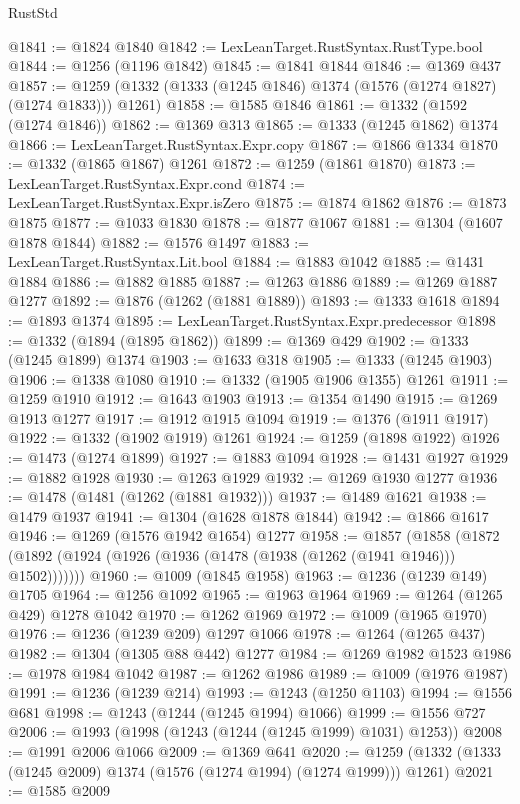 \begin{lexlean}{RustStd}
\begin{coremodule}
{\begin{coremodule}
{{{{{{{{{{{{{{{{{{{{{{{{{{{{{{{{{{{@1841 := @1824 @1840
@1842 := LexLeanTarget.RustSyntax.RustType.bool
@1844 := @1256 (@1196 @1842)
@1845 := @1841 @1844
@1846 := @1369 @437
@1857 := @1259 (@1332 (@1333 (@1245 @1846) @1374 (@1576 (@1274 @1827) (@1274 @1833))) @1261)
@1858 := @1585 @1846
@1861 := @1332 (@1592 (@1274 @1846))
@1862 := @1369 @313
@1865 := @1333 (@1245 @1862) @1374
@1866 := LexLeanTarget.RustSyntax.Expr.copy
@1867 := @1866 @1334
@1870 := @1332 (@1865 @1867) @1261
@1872 := @1259 (@1861 @1870)
@1873 := LexLeanTarget.RustSyntax.Expr.cond
@1874 := LexLeanTarget.RustSyntax.Expr.isZero
@1875 := @1874 @1862
@1876 := @1873 @1875
@1877 := @1033 @1830
@1878 := @1877 @1067
@1881 := @1304 (@1607 @1878 @1844)
@1882 := @1576 @1497
@1883 := LexLeanTarget.RustSyntax.Lit.bool
@1884 := @1883 @1042
@1885 := @1431 @1884
@1886 := @1882 @1885
@1887 := @1263 @1886
@1889 := @1269 @1887 @1277
@1892 := @1876 (@1262 (@1881 @1889))
@1893 := @1333 @1618
@1894 := @1893 @1374
@1895 := LexLeanTarget.RustSyntax.Expr.predecessor
@1898 := @1332 (@1894 (@1895 @1862))
@1899 := @1369 @429
@1902 := @1333 (@1245 @1899) @1374
@1903 := @1633 @318
@1905 := @1333 (@1245 @1903)
@1906 := @1338 @1080
@1910 := @1332 (@1905 @1906 @1355) @1261
@1911 := @1259 @1910
@1912 := @1643 @1903
@1913 := @1354 @1490
@1915 := @1269 @1913 @1277
@1917 := @1912 @1915 @1094
@1919 := @1376 (@1911 @1917)
@1922 := @1332 (@1902 @1919) @1261
@1924 := @1259 (@1898 @1922)
@1926 := @1473 (@1274 @1899)
@1927 := @1883 @1094
@1928 := @1431 @1927
@1929 := @1882 @1928
@1930 := @1263 @1929
@1932 := @1269 @1930 @1277
@1936 := @1478 (@1481 (@1262 (@1881 @1932)))
@1937 := @1489 @1621
@1938 := @1479 @1937
@1941 := @1304 (@1628 @1878 @1844)
@1942 := @1866 @1617
@1946 := @1269 (@1576 @1942 @1654) @1277
@1958 := @1857
    (@1858 (@1872 (@1892 (@1924 (@1926 (@1936 (@1478 (@1938 (@1262 (@1941 @1946))) @1502)))))))
@1960 := @1009 (@1845 @1958)
@1963 := @1236 (@1239 @149) @1705
@1964 := @1256 @1092
@1965 := @1963 @1964
@1969 := @1264 (@1265 @429) @1278 @1042
@1970 := @1262 @1969
@1972 := @1009 (@1965 @1970)
@1976 := @1236 (@1239 @209) @1297 @1066
@1978 := @1264 (@1265 @437)
@1982 := @1304 (@1305 @88 @442) @1277
@1984 := @1269 @1982 @1523
@1986 := @1978 @1984 @1042
@1987 := @1262 @1986
@1989 := @1009 (@1976 @1987)
@1991 := @1236 (@1239 @214)
@1993 := @1243 (@1250 @1103)
@1994 := @1556 @681
@1998 := @1243 (@1244 (@1245 @1994) @1066)
@1999 := @1556 @727
@2006 := @1993 (@1998 (@1243 (@1244 (@1245 @1999) @1031) @1253))
@2008 := @1991 @2006 @1066
@2009 := @1369 @641
@2020 := @1259 (@1332 (@1333 (@1245 @2009) @1374 (@1576 (@1274 @1994) (@1274 @1999))) @1261)
@2021 := @1585 @2009
}}}}}}}}}}}}}}}}}}}}}}}}}}}}}}}}}}}
\end{coremodule}}
\end{coremodule}
\end{lexlean}
